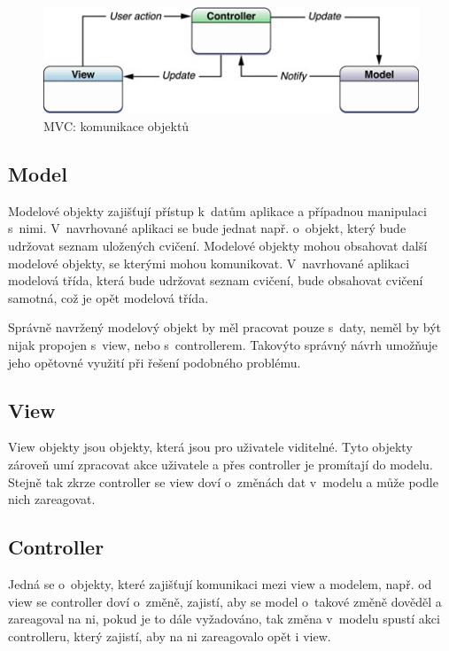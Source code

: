 \documentclass[thesis=B,czech]{FITthesis}[2012/06/26]
\begin{document}
	\begin{figure}[h!t]
		\centering
		\includegraphics[width=\textwidth]{img/model_view_controller}
		\caption{MVC: komunikace objektů \cite{appleMVCOnline}}
		\label{pic:mvc_communication}
	\end{figure}

	\subsection{Model}

	Modelové objekty zajišťují přístup k~datům aplikace a případnou manipulaci s~nimi. V~navrhované aplikaci se bude jednat např. o~objekt, který bude udržovat seznam uložených cvičení. Modelové objekty mohou obsahovat další modelové objekty, se kterými mohou komunikovat. V~navrhované aplikaci modelová třída, která bude udržovat seznam cvičení, bude obsahovat cvičení samotná, což je opět modelová třída.

	Správně navržený modelový objekt by měl pracovat pouze s~daty, neměl by být nijak propojen s~view, nebo s~controllerem. Takovýto správný návrh umožňuje jeho opětovné využití při řešení podobného problému.\cite{appleMVCOnline}

	\subsection{View}

	View objekty jsou objekty, která jsou pro uživatele viditelné. Tyto objekty zároveň umí zpracovat akce uživatele a přes controller je promítají do modelu. Stejně tak zkrze controller se view doví o~změnách dat v~modelu a může podle nich zareagovat.

	\subsection{Controller}

	Jedná se o~objekty, které zajišťují komunikaci mezi view a modelem, např. od view se controller doví o~změně, zajistí, aby se model o~takové změně dověděl a zareagoval na ni, pokud je to dále vyžadováno, tak změna v~modelu spustí akci controlleru, který zajistí, aby na ni zareagovalo opět i view.
\end{document}
